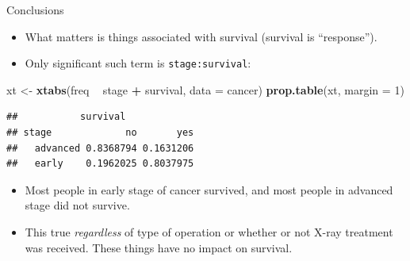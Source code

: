 \documentclass[ignorenonframetext,]{beamer}
\newenvironment{Shaded}{\begin{snugshade}}{\end{snugshade}}
\newcommand{\DataTypeTok}[1]{\textcolor[rgb]{0.13,0.29,0.53}{#1}}
\newcommand{\DecValTok}[1]{\textcolor[rgb]{0.00,0.00,0.81}{#1}}
\newcommand{\KeywordTok}[1]{\textcolor[rgb]{0.13,0.29,0.53}{\textbf{#1}}}
\newcommand{\NormalTok}[1]{#1}
\newcommand{\OperatorTok}[1]{\textcolor[rgb]{0.81,0.36,0.00}{\textbf{#1}}}
\newcommand{\StringTok}[1]{\textcolor[rgb]{0.31,0.60,0.02}{#1}}
\begin{document}
\begin{frame}[fragile]{Conclusions}
\protect\hypertarget{conclusions-2}{}

\begin{itemize}
\item
  What matters is things associated with survival (survival is
  ``response'').
\item
  Only significant such term is \texttt{stage:survival}:
\end{itemize}

\begin{Shaded}
\begin{Highlighting}[]
\NormalTok{xt <-}\StringTok{ }\KeywordTok{xtabs}\NormalTok{(freq }\OperatorTok{~}\StringTok{ }\NormalTok{stage }\OperatorTok{+}\StringTok{ }\NormalTok{survival, }\DataTypeTok{data =}\NormalTok{ cancer)}
\KeywordTok{prop.table}\NormalTok{(xt, }\DataTypeTok{margin =} \DecValTok{1}\NormalTok{)}
\end{Highlighting}
\end{Shaded}

\begin{verbatim}
##           survival
## stage             no       yes
##   advanced 0.8368794 0.1631206
##   early    0.1962025 0.8037975
\end{verbatim}

\begin{itemize}
\item
  Most people in early stage of cancer survived, and most people in
  advanced stage did not survive.
\item
  This true \emph{regardless} of type of operation or whether or not
  X-ray treatment was received. These things have no impact on survival.
\end{itemize}

\end{frame}
\end{document}
